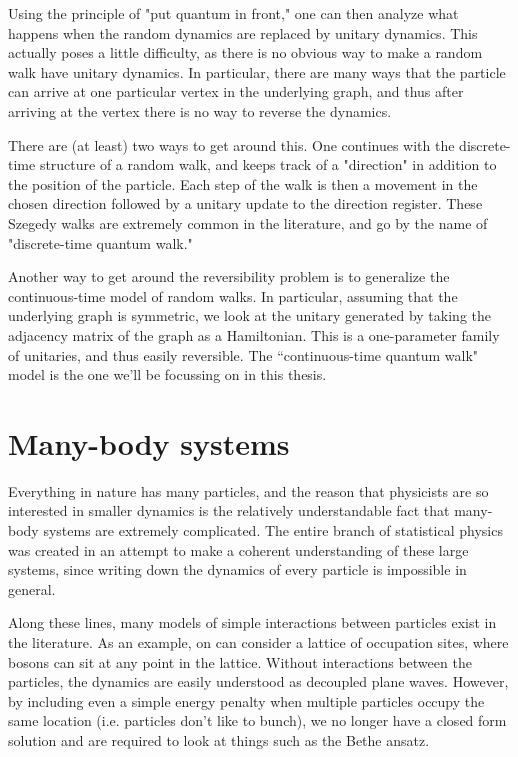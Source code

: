 \documentclass[../thesis-main/thesis-main]{subfiles}
\begin{document}
Using the principle of "put quantum in front," one can then analyze what happens when the random dynamics are replaced by unitary dynamics.  This actually poses a little difficulty, as there is no obvious way to make a random walk have unitary dynamics.  In particular, there are many ways that the particle can arrive at one particular vertex in the underlying graph, and thus after arriving at the vertex there is no way to reverse the dynamics.

There are (at least) two ways to get around this.  One continues with the discrete-time structure of a random walk, and keeps track of a "direction" in addition to the position of the particle.  Each step of the walk is then a movement in the chosen direction followed by a unitary update to the direction register.   These Szegedy walks are extremely common in the literature, and go by the name of "discrete-time quantum walk."

Another way to get around the reversibility problem is to generalize the continuous-time model of random walks.  In particular, assuming that the underlying graph is symmetric, we look at the unitary generated by taking the adjacency matrix of the graph as a Hamiltonian.  This is a one-parameter family of unitaries, and thus easily reversible.  The ``continuous-time quantum walk" model is the one we'll be focussing on in this thesis.


\section{Many-body systems}

Everything in nature has many particles, and the reason that physicists are so interested in smaller dynamics is the relatively understandable fact that many-body systems are extremely complicated.  The entire branch of statistical physics was created in an attempt to make a coherent understanding of these large systems, since writing down the dynamics of every particle is impossible in general.  

Along these lines, many models of simple interactions between particles exist in the literature.  As an example, on can consider a lattice of occupation sites, where bosons can sit at any point in the lattice.  Without interactions between the particles, the dynamics are easily understood as decoupled plane waves.  However, by including even a simple energy penalty when multiple particles occupy the same location (i.e. particles don't like to bunch), we no longer have a closed form solution and are required to look at things such as the Bethe ansatz.  
\end{document}
